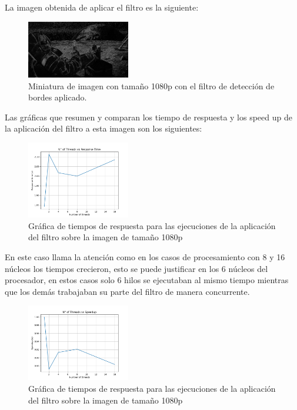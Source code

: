 La imagen obtenida de aplicar el filtro es la siguiente:

\begin{figure}[H]
    \centering
    \includegraphics[width=0.4\textwidth]{../plots/1080p.out.jpg}
    \caption{Miniatura de imagen con tamaño 1080p con el filtro de detección de bordes aplicado.}
\end{figure}

Las gráficas que resumen y comparan los tiempo de respuesta y los speed up de la aplicación del filtro a esta imagen son los siguientes:

\begin{figure}[H]
    \centering
    \includegraphics[width=0.4\textwidth]{../plots/1080p_response_time.png}
    \caption{Gráfica de tiempos de respuesta para las ejecuciones de la aplicación del filtro sobre la imagen de tamaño 1080p}
\end{figure}

En este caso llama la atención como en los casos de procesamiento con 8 y 16 núcleos los tiempos crecieron, esto se puede justificar en los 6 núcleos del procesador, en estos casos solo 6 hilos se ejecutaban al mismo tiempo mientras que los demás trabajaban su parte del filtro de manera concurrente.

\begin{figure}[H]
    \centering
    \includegraphics[width=0.4\textwidth]{../plots/1080p_speedup.png}
    \caption{Gráfica de tiempos de respuesta para las ejecuciones de la aplicación del filtro sobre la imagen de tamaño 1080p}
\end{figure}

